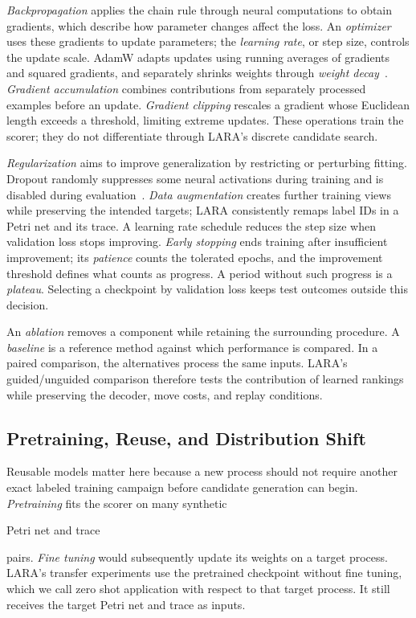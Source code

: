 \emph{Backpropagation} applies the chain rule through neural computations to obtain gradients, which describe how parameter changes affect the loss. An \emph{optimizer} uses these gradients to update parameters; the \emph{learning rate}, or step size, controls the update scale. AdamW adapts updates using running averages of gradients and squared gradients, and separately shrinks weights through \emph{weight decay}~\cite{AdamW2019}. \emph{Gradient accumulation} combines contributions from separately processed examples before an update. \emph{Gradient clipping} rescales a gradient whose Euclidean length exceeds a threshold, limiting extreme updates. These operations train the scorer; they do not differentiate through LARA's discrete candidate search.

\emph{Regularization} aims to improve generalization by restricting or perturbing fitting. Dropout randomly suppresses some neural activations during training and is disabled during evaluation~\cite{Srivastava2014}. \emph{Data augmentation} creates further training views while preserving the intended targets; LARA consistently remaps label IDs in a Petri net and its trace. A learning rate schedule reduces the step size when validation loss stops improving. \emph{Early stopping} ends training after insufficient improvement; its \emph{patience} counts the tolerated epochs, and the improvement threshold defines what counts as progress. A period without such progress is a \emph{plateau}. Selecting a checkpoint by validation loss keeps test outcomes outside this decision.

An \emph{ablation} removes a component while retaining the surrounding procedure. A \emph{baseline} is a reference method against which performance is compared. In a paired comparison, the alternatives process the same inputs. LARA's guided/unguided comparison therefore tests the contribution of learned rankings while preserving the decoder, move costs, and replay conditions.

\subsection{Pretraining, Reuse, and Distribution Shift}

Reusable models matter here because a new process should not require another exact labeled training campaign before candidate generation can begin. \emph{Pretraining} fits the scorer on many synthetic \begin{revised}Petri net and trace\end{revised} pairs. \emph{Fine tuning} would subsequently update its weights on a target process. LARA's transfer experiments use the pretrained checkpoint without fine tuning, which we call zero shot application with respect to that target process. It still receives the target Petri net and trace as inputs.

